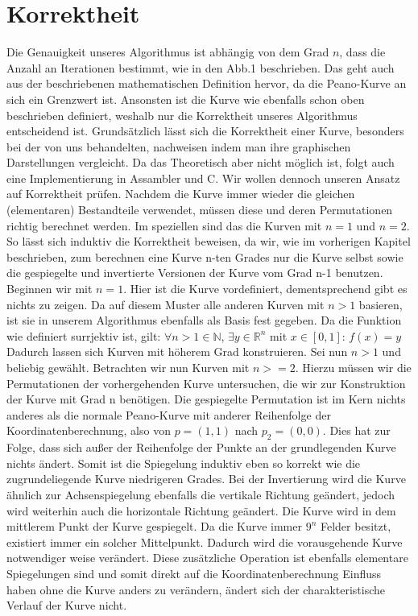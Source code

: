 \documentclass[course=asp]{aspdoc}
\begin{document}
\newpage

\section{Korrektheit} %

Die Genauigkeit unseres Algorithmus ist abhängig von dem Grad $n$, dass die Anzahl an Iterationen bestimmt, wie in den Abb.1 beschrieben. Das geht auch aus der beschriebenen mathematischen Definition hervor, da die Peano-Kurve an sich ein Grenzwert ist. Ansonsten ist die Kurve wie ebenfalls schon oben beschrieben definiert, weshalb nur die Korrektheit unseres Algorithmus entscheidend ist.
Grundsätzlich lässt sich die Korrektheit einer Kurve, besonders bei der von uns behandelten, nachweisen indem man ihre graphischen Darstellungen vergleicht. Da das Theoretisch aber nicht möglich ist, folgt auch eine Implementierung in Assambler und C.
Wir wollen dennoch unseren Ansatz auf Korrektheit prüfen.
Nachdem die Kurve immer wieder die gleichen (elementaren) Bestandteile verwendet, müssen diese und deren Permutationen richtig berechnet werden. Im speziellen sind das die Kurven mit $n = 1$ und $n = 2$. So lässt sich induktiv die Korrektheit beweisen, da wir, wie im vorherigen Kapitel beschrieben, zum berechnen eine Kurve n-ten Grades nur die Kurve selbst sowie die gespiegelte und invertierte Versionen der Kurve vom Grad n-1 benutzen.
Beginnen wir mit $n = 1$. Hier ist die Kurve vordefiniert, dementsprechend gibt es nichts zu zeigen. Da auf diesem Muster alle anderen Kurven mit $n>1$ basieren, ist sie in unserem Algorithmus ebenfalls als Basis fest gegeben.
Da die Funktion wie definiert surrjektiv ist, gilt: 
$\forall n>1 \in \mathbb{N}$, $\exists y \in \mathbb{R}^n$ mit $x \in [0,1]$: $f(x)= y$	%
Dadurch lassen sich Kurven mit höherem Grad konstruieren. Sei nun $n>1$ und beliebig gewählt.
Betrachten wir nun Kurven mit $n>=2$. Hierzu müssen wir die Permutationen der vorhergehenden Kurve untersuchen, die wir zur Konstruktion der Kurve mit Grad n benötigen.
Die gespiegelte Permutation ist im Kern nichts anderes als die normale Peano-Kurve mit anderer Reihenfolge der Koordinatenberechnung, also von $p=(1,1)$ nach $p_2 = (0,0)$. Dies hat zur Folge, dass sich außer der Reihenfolge der Punkte an der grundlegenden Kurve nichts ändert. Somit ist die Spiegelung induktiv eben so korrekt wie die zugrundeliegende Kurve niedrigeren Grades.
Bei der Invertierung wird die Kurve ähnlich zur Achsenspiegelung ebenfalls die vertikale Richtung geändert, jedoch wird weiterhin auch die horizontale Richtung geändert. Die Kurve wird in dem mittlerem Punkt der Kurve gespiegelt. Da die Kurve immer $9^n$ Felder besitzt, existiert immer ein solcher Mittelpunkt. Dadurch wird die vorausgehende Kurve notwendiger weise verändert.  Diese zusätzliche Operation ist ebenfalls elementare Spiegelungen sind und somit direkt auf die Koordinatenberechnung Einfluss haben ohne die Kurve anders zu verändern, ändert sich der charakteristische Verlauf der Kurve nicht.
\end{document}
